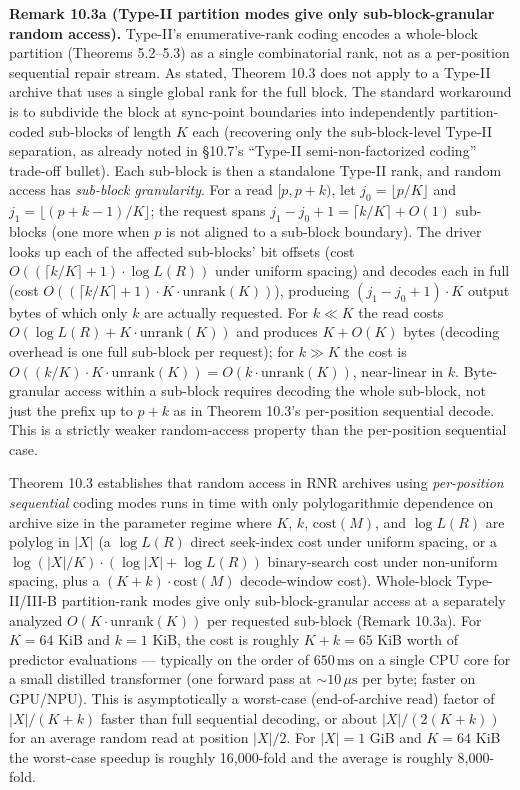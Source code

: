 \documentclass[
]{article}
\begin{document}
\textbf{Remark 10.3a (Type-II partition modes give only
sub-block-granular random access).} Type-II's enumerative-rank
coding encodes a whole-block partition (Theorems 5.2--5.3) as a
single combinatorial rank, not as a per-position sequential repair
stream. As stated, Theorem 10.3 does not apply to a Type-II archive
that uses a single global rank for the full block. The standard
workaround is to subdivide the block at sync-point boundaries into
independently partition-coded sub-blocks of length $K$ each
(recovering only the sub-block-level Type-II separation, as already
noted in §10.7's ``Type-II semi-non-factorized coding'' trade-off
bullet). Each sub-block is then a standalone Type-II rank, and
random access has \emph{sub-block granularity}. For a read
$[p, p+k)$, let $j_0 = \lfloor p/K \rfloor$ and
$j_1 = \lfloor (p+k-1)/K \rfloor$; the request spans
$j_1 - j_0 + 1 = \lceil k/K \rceil + O(1)$ sub-blocks (one more
when $p$ is not aligned to a sub-block boundary). The driver looks
up each of the affected sub-blocks' bit offsets (cost
$O((\lceil k/K \rceil + 1) \cdot \log L(R))$ under uniform spacing)
and decodes each in full (cost $O((\lceil k/K \rceil + 1) \cdot K
\cdot \mathrm{unrank}(K))$), producing $(j_1 - j_0 + 1) \cdot K$
output bytes of which only $k$ are actually requested. For
$k \ll K$ the read costs $O(\log L(R) + K \cdot \mathrm{unrank}(K))$
and produces $K + O(K)$ bytes (decoding overhead is one full
sub-block per request); for $k \gg K$ the cost is
$O((k/K) \cdot K \cdot \mathrm{unrank}(K)) = O(k \cdot
\mathrm{unrank}(K))$, near-linear in $k$. Byte-granular access
within a sub-block requires decoding the whole sub-block, not just
the prefix up to $p+k$ as in Theorem 10.3's per-position sequential
decode. This is a strictly weaker random-access property than the
per-position sequential case.

Theorem 10.3 establishes that random access in RNR archives using
\emph{per-position sequential} coding modes runs in time with only
polylogarithmic dependence on archive size in the parameter regime
where $K$, $k$, $\mathrm{cost}(M)$, and $\log L(R)$ are polylog in
$|X|$ (a $\log L(R)$ direct seek-index cost under uniform spacing,
or a $\log(|X|/K) \cdot (\log |X| + \log L(R))$ binary-search cost
under non-uniform spacing, plus a $(K+k) \cdot \mathrm{cost}(M)$
decode-window cost).
Whole-block Type-II/III-B partition-rank modes give only
sub-block-granular access at a separately analyzed
$O(K \cdot \mathrm{unrank}(K))$ per requested sub-block (Remark
10.3a). For $K = 64$ KiB and $k = 1$ KiB, the cost is roughly
$K + k = 65$ KiB worth of predictor evaluations --- typically on
the order of $650\,\text{ms}$ on a single CPU core for a small
distilled transformer (one forward pass at $\sim 10\,\mu\text{s}$
per byte; faster on GPU/NPU). This is asymptotically a worst-case (end-of-archive read)
factor of $|X|/(K + k)$ faster than full sequential decoding, or
about $|X| / (2(K + k))$ for an average random read at position
$|X|/2$. For $|X| = 1$ GiB and $K = 64$ KiB the worst-case
speedup is roughly 16{,}000-fold and the average is roughly
8{,}000-fold.
\end{document}
